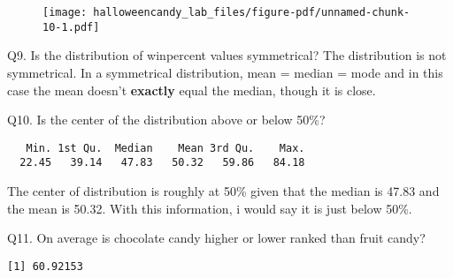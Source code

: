 \documentclass[
  letterpaper,
  DIV=11,
  numbers=noendperiod]{scrartcl}
\newenvironment{Shaded}{\begin{snugshade}}{\end{snugshade}}
\newcommand{\FunctionTok}[1]{\textcolor[rgb]{0.28,0.35,0.67}{#1}}
\newcommand{\NormalTok}[1]{\textcolor[rgb]{0.00,0.23,0.31}{#1}}
\newcommand{\SpecialCharTok}[1]{\textcolor[rgb]{0.37,0.37,0.37}{#1}}
\begin{document}
\begin{figure}[H]

{\centering \texttt{[image: halloweencandy\_lab\_files/figure-pdf/unnamed-chunk-10-1.pdf]}

}

\end{figure}

Q9. Is the distribution of winpercent values symmetrical? The
distribution is not symmetrical. In a symmetrical distribution, mean =
median = mode and in this case the mean doesn't \textbf{exactly} equal
the median, though it is close.

Q10. Is the center of the distribution above or below 50\%?

\begin{Shaded}
\end{Shaded}

\begin{verbatim}
   Min. 1st Qu.  Median    Mean 3rd Qu.    Max. 
  22.45   39.14   47.83   50.32   59.86   84.18 
\end{verbatim}

The center of distribution is roughly at 50\% given that the median is
47.83 and the mean is 50.32. With this information, i would say it is
just below 50\%.

Q11. On average is chocolate candy higher or lower ranked than fruit
candy?

\begin{Shaded}
\end{Shaded}

\begin{verbatim}
[1] 60.92153
\end{verbatim}

\begin{Shaded}
\end{Shaded}
\end{document}
